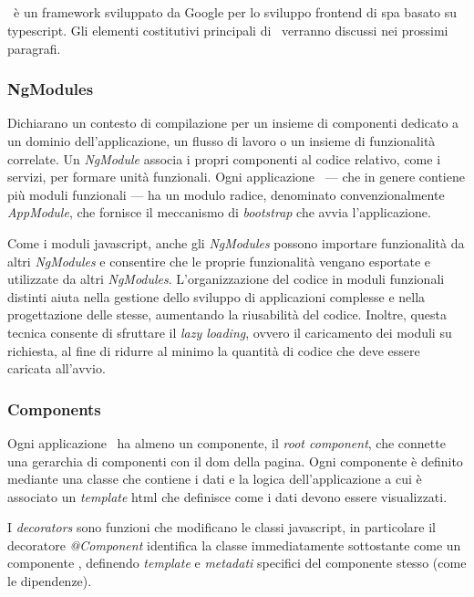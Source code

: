 \subsection{\angular}

\angular~è un \gls{framework} sviluppato da Google per lo sviluppo \gls{frontend} di \gls{spa} basato su \gls{typescript}. Gli elementi costitutivi principali di \angular~verranno discussi nei prossimi paragrafi.


\subsubsection{NgModules}
\label{chap:ngmodules}
Dichiarano un contesto di compilazione per un insieme di componenti dedicato a un dominio dell'applicazione, un flusso di lavoro o un insieme di funzionalità correlate. Un \textit{NgModule} associa i propri componenti al codice relativo, come i servizi, per formare unità funzionali.
% 
Ogni applicazione \angular~--- che in genere contiene più moduli funzionali ---  ha un modulo radice, denominato convenzionalmente \textit{AppModule}, che fornisce il meccanismo di \textit{bootstrap} che avvia l'applicazione.

Come i moduli \gls{javascript}, anche gli \textit{NgModules} possono importare funzionalità da altri \textit{NgModules} e consentire che le proprie funzionalità vengano esportate e utilizzate da altri \textit{NgModules}.
%
L'organizzazione del codice in moduli funzionali distinti aiuta nella gestione dello sviluppo di applicazioni complesse e nella progettazione delle stesse, aumentando la riusabilità del codice. Inoltre, questa tecnica consente di sfruttare il \textit{lazy loading}, ovvero il caricamento dei moduli su richiesta, al fine di ridurre al minimo la quantità di codice che deve essere caricata all'avvio.

\subsubsection{Components}

Ogni applicazione \angular~ha almeno un componente, il \textit{root component}, che connette una gerarchia di componenti con il \acrshort{dom} della pagina. Ogni componente è definito mediante una classe che contiene i dati e la logica dell'applicazione a cui è associato un \textit{template} \acrshort{html} che definisce come i dati devono essere visualizzati.

I \textit{decorators} sono funzioni che modificano le classi \gls{javascript}, in particolare il decoratore \textit{@Component} identifica la classe immediatamente sottostante come un componente \angular, definendo \textit{template} e \textit{metadati} specifici del componente stesso (come le dipendenze).

